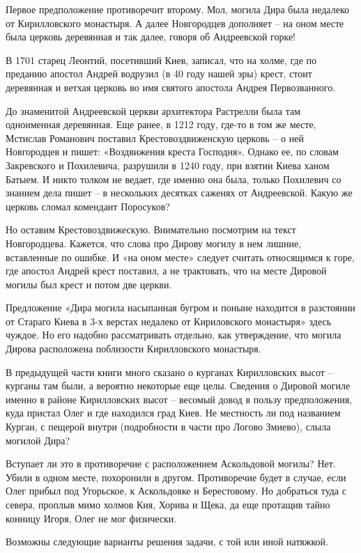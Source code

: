 Первое предположение противоречит второму. Мол, могила Дира была недалеко от Кирилловского монастыря. А далее Новгородцев дополняет – на оном месте была церковь деревянная и так далее, говоря об Андреевской горке!

В 1701 старец Леонтий, посетивший Киев, записал, что на холме, где по преданию апостол Андрей водрузил (в 40 году нашей эры) крест, стоит деревянная и ветхая церковь во имя святого апостола Андрея Первозванного. 

До знаменитой Андреевской церкви архитектора Растрелли была там одноименная деревянная. Еще ранее, в 1212 году, где-то в том же месте, Мстислав Романович поставил Крестовоздвиженскую церковь – о ней Новгородцев и пишет: «Воздвижения креста Господня». Однако ее, по словам Закревского и Похилевича, разрушили в 1240 году, при взятии Киева ханом Батыем. И никто толком не ведает, где именно она была, только Похилевич со знанием дела пишет – в нескольких десятках саженях от Андреевской. Какую же церковь сломал комендант Поросуков?

Но оставим Крестовоздвижескую. Внимательно посмотрим на текст Новгородцева. Кажется, что слова про Дирову могилу в нем лишние, вставленные по ошибке. И «на оном месте» следует считать относящимся к горе, где апостол Андрей крест поставил, а не трактовать, что на месте Дировой могилы был крест и потом две церкви.

Предложение «Дира могила насыпанная бугром и поныне находится в разстоянии от Стараго Киева в 3-х верстах недалеко от Кириловского монастыря» здесь чуждое. Но его надобно рассматривать отдельно, как утверждение, что могила Дирова расположена поблизости Кирилловского монастыря.

В предыдущей части книги много сказано о курганах Кирилловских высот – курганы там были, а вероятно некоторые еще целы. Сведения о Дировой могиле именно в районе Кирилловских высот – весомый довод в пользу предположения, куда пристал Олег и где находился град Киев. Не местность ли под названием Курган, с пещерой внутри (подробности в части про Логово Змиево), слыла могилой Дира?

Вступает ли это в противоречие с расположением Аскольдовой могилы? Нет. Убили в одном месте, похоронили в другом. Противоречие будет в случае, если Олег прибыл под Угорьское, к Аскольдовке и Берестовому. Но добраться туда с севера, проплыв мимо холмов Кия, Хорива и Щека, да еще протащив тайно конницу Игоря, Олег не мог физически.

Возможны следующие варианты решения задачи, с той или иной натяжкой.

